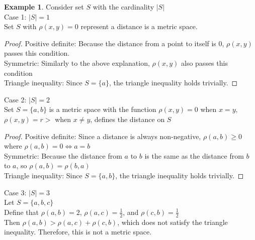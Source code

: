 \documentclass[12pt, reqno]{amsart}
\theoremstyle{definition}
\newtheorem{example}[theorem]{Example}
\numberwithin{equation}{section}
\newcommand{\tabb}{\hspace*{1cm}}
\begin{document}
    \begin{example}
        Consider set $S$ with the cardinality $|S|$\\
        Case 1: $|S| =  1$\\
        \tabb Set $S$ with $\rho(x,y)=0$ represent a distance is a metric space.
        \begin{proof}
        Positive definite: Because the distance from a point to itself is 0, $\rho(x,y)$ passes this condition.\\
        Symmetric: Similarly to the above explanation, $\rho(x,y)$ also passes this condition\\
        Triangle inequality: Since $S = \{a\}$, the triangle inequality holds trivially.
        \end{proof}
        Case 2: $|S| = 2$\\
        \tabb Set $S = \{a, b\}$ is a metric space with the function $\rho(x, y)=0$ when $x=y,$ $\rho(x, y)=r>$ when $x\neq y$, defines the distance on $S$
        \begin{proof}
        Positive definite: Since a distance is always non-negative, $\rho(a, b) \geq 0$ where ${\rho(a, b) = 0 \iff a = b}$\\
        Symmetric: Because the distance from $a$ to $b$ is the same as the distance from $b$ to $a$, so $\rho(a, b) = \rho(b, a)$\\
        Triangle inequality: Since $S = \{a, b\}$, the triangle inequality holds trivially.
        \end{proof}
        
        Case 3: $|S| = 3$\\
        \tabb Let $S = \{a, b, c\}$\\
        Define that $\rho(a, b) = 2$, $\rho(a, c) = \frac{1}{2}$, and $\rho(c, b) = \frac{1}{2}$\\
        Then $\rho(a, b) > \rho(a, c) + \rho(c, b)$, which does not satisfy the triangle inequality.
        Therefore, this is not a metric space.
    \end{example}
\end{document}
